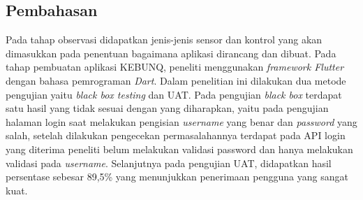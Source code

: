 \begin{flushleft}
\begin{justify}
   
        \section{Pembahasan}
        Pada tahap observasi didapatkan jenis-jenis sensor dan kontrol yang akan dimasukkan pada penentuan bagaimana aplikasi dirancang dan dibuat. Pada tahap pembuatan aplikasi KEBUNQ, peneliti menggunakan \emph{framework Flutter} dengan bahasa pemrograman \emph{Dart}. Dalam penelitian ini dilakukan dua metode pengujian yaitu \emph{black box testing} dan UAT. Pada pengujian \emph{black box} terdapat satu hasil yang tidak sesuai dengan yang diharapkan, yaitu pada
        pengujian halaman login saat melakukan pengisian \emph{username} yang benar dan \emph{password} yang salah, setelah dilakukan pengecekan permasalahannya terdapat pada API login yang diterima peneliti 
        belum melakukan validasi password dan hanya melakukan validasi pada \emph{username}. Selanjutnya pada pengujian UAT, didapatkan hasil persentase sebesar 89,5\% yang menunjukkan penerimaan pengguna yang sangat kuat.
         

    








    \end{justify}




    
\end{flushleft}

\newpage